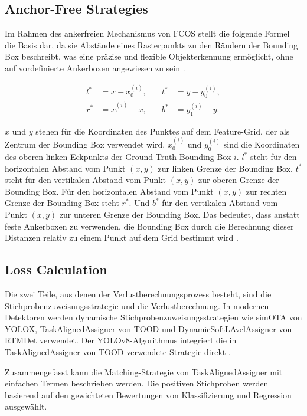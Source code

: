 \documentclass[a4paper,12pt]{article}
\begin{document}
\subsection{Anchor-Free Strategies}
Im Rahmen des ankerfreien Mechanismus von FCOS stellt die folgende Formel die Basis dar, da sie Abstände eines Rasterpunkts zu den Rändern der Bounding Box beschreibt, was eine präzise und flexible Objekterkennung ermöglicht, ohne auf vordefinierte Ankerboxen angewiesen zu sein \cite{tian2019fcos, wang2018anchor}.

\[
\begin{aligned}
l^* &= x - x_0^{(i)}, & \quad t^* &= y - y_0^{(i)}, \\
r^* &= x_1^{(i)} - x, & \quad b^* &= y_1^{(i)} - y.
\end{aligned}
\]



\noindent $x$ und $y$ stehen für die Koordinaten des Punktes auf dem Feature-Grid, der als Zentrum der Bounding Box verwendet wird. $x_0^{(i)}$ und $y_0^{(i)}$ sind die Koordinaten des oberen linken Eckpunkts der Ground Truth Bounding Box $i$. $l^*$ steht für den horizontalen Abstand vom Punkt $(x,y)$ zur linken Grenze der Bounding Box. $t^*$ steht für den vertikalen Abstand vom Punkt $(x,y)$ zur oberen Grenze der Bounding Box. Für den horizontalen Abstand vom Punkt $(x,y)$ zur rechten Grenze der Bounding Box steht $r^*$. Und $b^*$ für den vertikalen Abstand vom Punkt $(x,y)$ zur unteren Grenze der Bounding Box.
Das bedeutet, dass anstatt feste Ankerboxen zu verwenden, die Bounding Box durch die Berechnung dieser Distanzen relativ zu einem Punkt auf dem Grid bestimmt wird \cite{tian2019fcos, wang2018anchor}.

\subsection{Loss Calculation}
Die zwei Teile, aus denen der Verlustberechnungsprozess besteht, sind die Stichprobenzuweisungsstrategie und die Verlustberechnung. In modernen Detektoren werden dynamische Stichprobenzuweisungsstrategien wie simOTA von YOLOX, TaskAlignedAssigner von TOOD und DynamicSoftLAvelAssigner von RTMDet verwendet. Der YOLOv8-Algorithmus integriert die in TaskAlignedAssigner von TOOD verwendete Strategie direkt \cite{yolov8_architecture}.

\noindent Zusammengefasst kann die Matching-Strategie von TaskAlignedAssigner mit einfachen Termen beschrieben werden. Die positiven Stichproben werden basierend auf den gewichteten Bewertungen von Klassifizierung und Regression ausgewählt.
\end{document}
